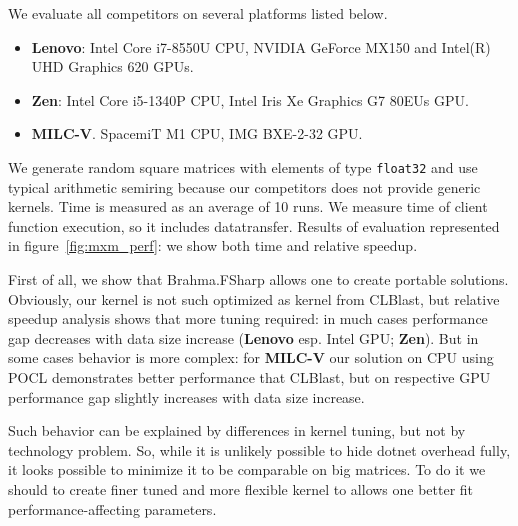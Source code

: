We evaluate all competitors on several platforms listed below.
\begin{itemize}
  \item \textbf{Lenovo}: Intel Core i7-8550U CPU, NVIDIA GeForce MX150 and Intel(R) UHD Graphics 620 GPUs.
  \item \textbf{Zen}: Intel Core i5-1340P CPU, Intel Iris Xe Graphics G7 80EUs GPU.
  \item \textbf{MILC-V}. SpacemiT M1 CPU, IMG BXE-2-32 GPU.
\end{itemize}

We generate random square matrices with elements of type \texttt{float32} and use typical arithmetic semiring because our competitors does not provide generic kernels.
Time is measured as an average of 10 runs.
We measure time of client function execution, so it includes datatransfer.
Results of evaluation represented in figure~\ref{fig:mxm_perf}: we show both time and relative speedup.

First of all, we show that Brahma.FSharp allows one to create portable solutions.
Obviously, our kernel is not such optimized as kernel from CLBlast, but relative speedup analysis shows that more tuning required: in much cases performance gap decreases with data size increase (\textbf{Lenovo} esp. Intel GPU; \textbf{Zen}).
But in some cases behavior is more complex: for \textbf{MILC-V} our solution on CPU using POCL demonstrates better performance that CLBlast, but on respective GPU performance gap slightly increases with data size increase.

Such behavior can be explained by differences in kernel tuning, but not by technology problem.
So, while it is unlikely possible to hide dotnet overhead fully, it looks possible to minimize it to be comparable on big matrices.
To do it we should to create finer tuned and more flexible kernel to allows one better fit performance-affecting parameters.